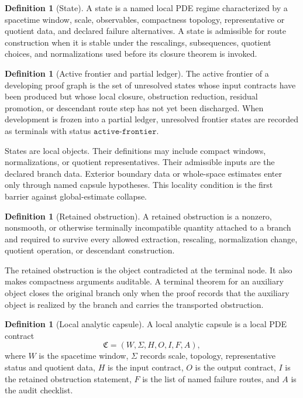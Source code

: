 \documentclass[11pt]{article}
\theoremstyle{plain}
\theoremstyle{definition}
\newtheorem{definition}[theorem]{Definition}
\theoremstyle{remark}
\newcommand{\capsule}{\mathfrak C}
\begin{document}
\begin{definition}[State]
A state is a named local PDE regime characterized by a spacetime window,
scale, observables, compactness topology, representative or quotient data, and declared
failure alternatives.  A state is admissible for route construction when it is stable under
the rescalings, subsequences, quotient choices, and normalizations used before its
closure theorem is invoked.
\end{definition}

\begin{definition}[Active frontier and partial ledger]
The active frontier of a developing proof graph is the set of unresolved states
whose input contracts have been produced but whose local closure, obstruction
reduction, residual promotion, or descendant route step has not yet been
discharged.  When development is frozen into a partial ledger, unresolved
frontier states are recorded as terminals with status \(\texttt{active-frontier}\).
\end{definition}

States are local objects.  Their definitions may include compact windows,
normalizations, or quotient representatives.  Their admissible inputs are the
declared branch data.  Exterior boundary data or whole-space estimates enter
only through named capsule hypotheses.  This locality condition is the first
barrier against global-estimate collapse.

\begin{definition}[Retained obstruction]
A retained obstruction is a nonzero, nonsmooth, or otherwise terminally
incompatible quantity attached to a branch and required to survive every
allowed extraction, rescaling, normalization change, quotient operation, or descendant
construction.
\end{definition}

The retained obstruction is the object contradicted at the terminal node.  It
also makes compactness arguments auditable.  A terminal theorem for an
auxiliary object closes the original branch only when the proof records that
the auxiliary object is realized by the branch and carries the transported
obstruction.

\begin{definition}[Local analytic capsule]
A local analytic capsule is a local PDE contract
\[
  \capsule=(W,\Sigma,H,O,I,F,A),
\]
where \(W\) is the spacetime window, \(\Sigma\) records scale, topology,
representative status and quotient data, \(H\) is the input contract,
\(O\) is the output contract, \(I\) is the retained obstruction statement,
\(F\) is the list of named failure routes, and \(A\) is the audit checklist.
\end{definition}
\end{document}
